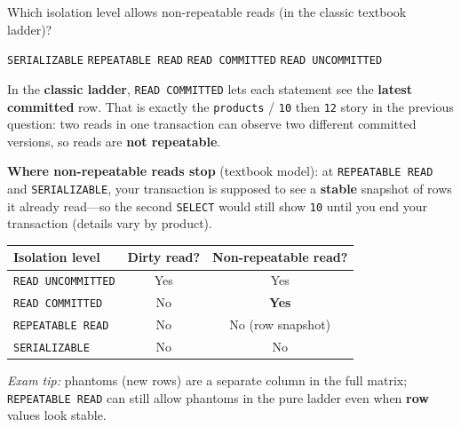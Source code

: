 \question[4]
Which isolation level allows non-repeatable reads (in the classic textbook ladder)?
\begin{choices}
  \choice \texttt{SERIALIZABLE}
  \choice \texttt{REPEATABLE READ}
  \CorrectChoice \texttt{READ COMMITTED}
  \choice \texttt{READ UNCOMMITTED}
\end{choices}
\begin{solution}
  In the \textbf{classic ladder}, \texttt{READ COMMITTED} lets each statement see the \textbf{latest committed} row. That is exactly the \texttt{products} / \texttt{10} then \texttt{12} story in the previous question: two reads in one transaction can observe two different committed versions, so reads are \textbf{not repeatable}.
 
  \medskip
  \noindent\textbf{Where non-repeatable reads stop} (textbook model): at \texttt{REPEATABLE READ} and \texttt{SERIALIZABLE}, your transaction is supposed to see a \textbf{stable} snapshot of rows it already read---so the second \texttt{SELECT} would still show \texttt{10} until you end your transaction (details vary by product).

  \begin{center}
  \footnotesize
  \renewcommand{\arraystretch}{1.15}
  \begin{tabular}{|l|c|c|}
    \hline
    \textbf{Isolation level} & \textbf{Dirty read?} & \textbf{Non-repeatable read?} \\
    \hline
    \texttt{READ UNCOMMITTED}  & Yes & Yes \\
    \texttt{READ COMMITTED}    & No  & \textbf{Yes} \\
    \texttt{REPEATABLE READ}   & No  & No (row snapshot) \\
    \texttt{SERIALIZABLE}      & No  & No \\
    \hline
  \end{tabular}
  \renewcommand{\arraystretch}{1}
  \end{center}

  \noindent\footnotesize\textit{Exam tip:} phantoms (new rows) are a separate column in the full matrix; \texttt{REPEATABLE READ} can still allow phantoms in the pure ladder even when \textbf{row} values look stable.
\end{solution}


\newpage 

